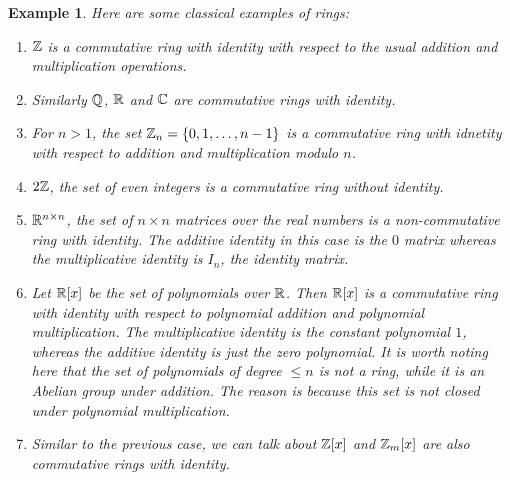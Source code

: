 \documentclass[12pt]{article}
\theoremstyle{plain}
\newtheorem{example}{Example}
\theoremstyle{definition}
\theoremstyle{remark}
\begin{document}
\begin{example}
Here are some classical examples of rings:
\begin{enumerate}
    \item $\mathbb{Z}$ is a commutative ring with identity with respect to the usual addition and multiplication operations. 
    \item Similarly $\mathbb{Q}$, $\mathbb{R}$ and $\mathbb{C}$ are commutative rings with identity.
    \item For $n>1$, the set $\mathbb{Z}_n=\{0,1, \dots, n-1\}$ is a commutative ring with idnetity with respect to addition and multiplication modulo $n$. 
    \item $2\mathbb{Z}$, the set of even integers is a commutative ring without identity.
    \item $\mathbb{R}^{n\times n}$, the set of $n\times n$ matrices over the real numbers is a non-commutative ring with identity. The additive identity in this case is the $0$ matrix whereas the multiplicative identity is $I_n$, the identity matrix. 
    \item Let $\mathbb{R}[x]$ be the set of polynomials over $\mathbb{R}$. Then $\mathbb{R}[x]$ is a commutative ring with identity with respect to polynomial addition and polynomial multiplication. The multiplicative identity is the constant polynomial $1$, whereas the additive identity is just the zero polynomial. It is worth noting here that the set of polynomials of degree $\leq n$ is not a ring, while it is an Abelian group under addition. The reason is because this set is not closed under polynomial multiplication.  
    \item Similar to the previous case, we can talk about 
    $\mathbb{Z}[x]$ and $\mathbb{Z}_m[x]$ are also commutative rings with identity. 
    \end{enumerate}
    \end{example}
    
\end{document}
